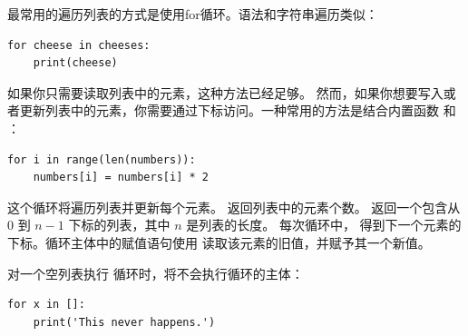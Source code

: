 
最常用的遍历列表的方式是使用for循环。语法和字符串遍历类似：

\begin{lstlisting}
for cheese in cheeses:
    print(cheese)
\end{lstlisting}

%

如果你只需要读取列表中的元素，这种方法已经足够。 然而，如果你想要写入或者更新列表中的元素，你需要通过下标访问。一种常用的方法是结合内置函数  和  ：
  

\begin{lstlisting}
for i in range(len(numbers)):
    numbers[i] = numbers[i] * 2
\end{lstlisting}

%

这个循环将遍历列表并更新每个元素。  返回列表中的元素个数。  返回一个包含从 0 到 $n-1$ 下标的列表，其中 $n$ 是列表的长度。
每次循环中， 得到下一个元素的下标。循环主体中的赋值语句使用  读取该元素的旧值，并赋予其一个新值。
  


对一个空列表执行  循环时，将不会执行循环的主体：

\begin{lstlisting}
for x in []:
    print('This never happens.')
\end{lstlisting}

%

